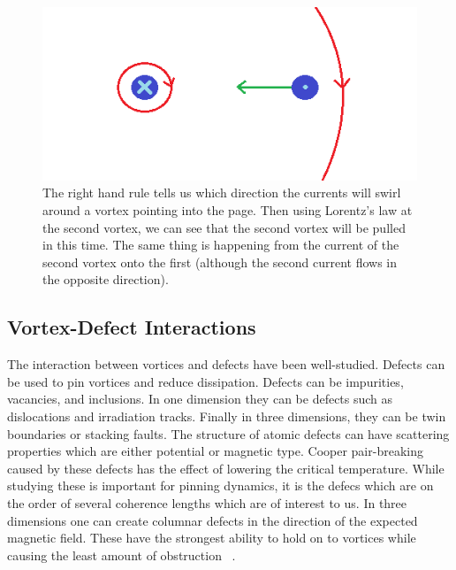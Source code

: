 \begin{figure}[htbp]
\begin{center}
\includegraphics[scale=.50]{oppositeVortex.png}
\caption{The right hand rule tells us which direction the currents will swirl around a vortex pointing into the page. Then using Lorentz's law  at the second vortex, we can see that the second vortex will be pulled in this time. The same thing is happening from the current of the second vortex onto the first (although the second current flows in the opposite direction).}
\label{diffV}
\end{center}
\end{figure}

\subsection{Vortex-Defect Interactions}
The interaction between vortices and defects have been well-studied. Defects can be used to pin vortices and reduce dissipation. Defects can be impurities, vacancies, and inclusions. In one dimension they can be defects such as dislocations and irradiation tracks. Finally in three dimensions, they can be twin boundaries or stacking faults. The structure of atomic defects can have scattering properties which are either potential or magnetic type. Cooper pair-breaking caused by these defects has the effect of lowering the critical temperature. While studying these is important for pinning dynamics, it is the defecs which are on the order of several coherence lengths which are of interest to us. In three dimensions one can create columnar defects in the direction of the expected magnetic field. These have the strongest ability to hold on to vortices while causing the least amount of obstruction ~\cite{Kwok16}.

